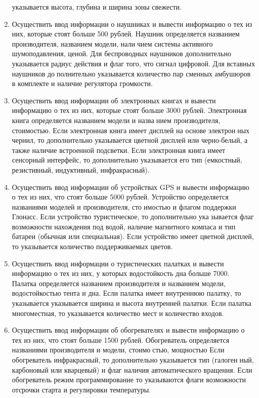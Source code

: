 \begin{enumerate}
указывается высота, глубина и ширина зоны свежести.
\item Осуществить ввод информации о наушниках и вывести информацию о тех из них, которые стоят
больше 500 рублей. Наушник определяется названием производителя, названием модели, наличием системы активного шумоподавления, ценой. Для беспроводных наушников дополнительно
указывается радиус действия и флаг того, что сигнал цифровой. Для вставных наушников дополнительно указывается количество пар сменных амбушюров в комплекте и наличие регулятора
громкости.
\item Осуществить ввод информации об электронных книгах и вывести информацию о тех из них,
которые стоят больше 3000 рублей. Электронная книга определяется названием модели и названием производителя, стоимостью. Если электронная книга имеет дисплей на основе электронных чернил, то дополнительно указывается цветной дисплей или черно-белый, а также наличие
встроенной подсветки. Если электронная книга имеет сенсорный интерфейс, то дополнительно
указывается его тип (емкостный, резистивный, индуктивный, инфракрасный).
\item Осуществить ввод информации об устройствах GPS и вывести информацию о тех из них, что
стоят больше 5000 рублей. Устройство определяется названиями моделей и производителя, стоимостью и флагом поддержки Глонасс. Если устройство туристическое, то дополнительно указывается флаг возможности нахождения под водой, наличие магнитного компаса и тип батареи
(обычная или специальная). Если устройство имеет цветной дисплей, то указывается количество
поддерживаемых цветов.
\item Осуществить ввод информации о туристических палатках и вывести информацию о тех из них,
у которых водостойкость дна больше 7000. Палатка определяется названием производителя и
названием модели, водостойкостью тента и дна. Если палатка имеет внутреннюю палатку, то
указывается указывается ширина и высота внутренней палатки. Если палатка многоместная, то
указывается количество мест и количество входов.
\item Осуществить ввод информации об обогревателях и вывести информацию о тех из них, что стоят
больше 1500 рублей. Обогреватель определяется названиями производителя и модели, стоимостью, мощностью Если обогреватель инфракрасный, то дополнительно указывается тип (галогенный, карбоновый или кварцевый) и флаг наличия автоматического вращения. Если обогреватель
режим программирование то указываются флаги возможности отсрочки старта и регулировки
температуры.

\end{enumerate}

